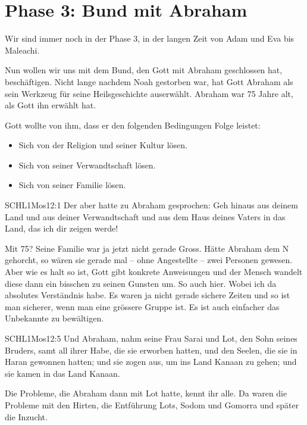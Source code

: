 \section{Phase 3: Bund mit Abraham}

        Wir sind immer noch in der Phase 3, in der langen Zeit von Adam und Eva bis Maleachi. 

        Nun wollen wir uns mit dem Bund, den Gott mit Abraham geschlossen hat, beschäftigen. Nicht lange nachdem Noah gestorben war, hat Gott Abraham als sein Werkzeug für seine Heilsgeschichte auserwählt. Abraham war 75 Jahre alt, als Gott ihn erwählt hat.
        
        Gott wollte von ihm, dass er den folgenden Bedingungen Folge leistet:
        \begin{itemize}
        	\item Sich von der Religion und seiner Kultur lösen.
        	\item Sich von seiner Verwandtschaft lösen.
        	\item Sich von seiner Familie lösen.
        \end{itemize}
        \begin{bibelquote}{SCHL}{1Mos}{12:1}
            Der \herr{} aber hatte zu Abraham gesprochen: Geh hinaus aus deinem Land und aus deiner Verwandtschaft und aus dem Haus deines Vaters in das Land, das ich dir zeigen werde!
        \end{bibelquote}
        Mit 75? Seine Familie war ja jetzt nicht gerade Gross. Hätte Abraham dem \herr N gehorcht, so wären sie gerade mal -- ohne Angestellte -- zwei Personen gewesen. Aber wie es halt so ist, Gott gibt konkrete Anweisungen und der Mensch wandelt diese dann ein bisschen zu seinen Gunsten um. So auch hier. Wobei ich da absolutes Verständnis habe. Es waren ja nicht gerade sichere Zeiten und so ist man sicherer, wenn man eine grössere Gruppe ist. Es ist auch einfacher das Unbekannte zu bewältigen.
        \begin{bibelquote}{SCHL}{1Mos}{12:5}
            Und Abraham, nahm seine Frau Sarai und Lot, den Sohn seines Bruders, samt all ihrer Habe, die sie erworben hatten, und den Seelen, die sie in Haran gewonnen hatten; und sie zogen aus, um ins Land Kanaan zu gehen; und sie kamen in das Land Kanaan.
        \end{bibelquote}
        Die Probleme, die Abraham dann mit Lot hatte, kennt ihr alle. Da waren die Probleme mit den Hirten, die Entführung Lots, Sodom und Gomorra und später die Inzucht.
        
